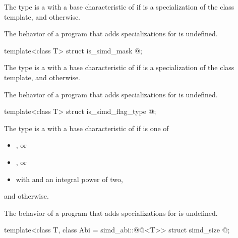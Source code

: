 \begin{itemdescr}
\pnum
The type  is a  with a base characteristic of  if  is a specialization of the  class template, and  otherwise.

\pnum
The behavior of a program that adds specializations for  is undefined.
\end{itemdescr}

\begin{itemdecl}
template<class T> struct is_simd_mask { @\seebelow@ };
\end{itemdecl}

\begin{itemdescr}
\pnum
The type  is a  with a base characteristic of  if  is a specialization of the  class template, and  otherwise.

\pnum
The behavior of a program that adds specializations for  is undefined.
\end{itemdescr}

\begin{itemdecl}
template<class T> struct is_simd_flag_type { @\seebelow@ };
\end{itemdecl}

\begin{itemdescr}
\pnum
The type  is a  with a base characteristic of  if  is one of
\begin{itemize}
  \item {}, or
  \item {}, or
  \item {} with  and  an integral power of two,
\end{itemize}
and  otherwise.

\pnum
The behavior of a program that adds specializations for  is undefined.
\end{itemdescr}

\begin{itemdecl}
template<class T, class Abi = simd_abi::@@<T>> struct simd_size { @\seebelow@ };
\end{itemdecl}

